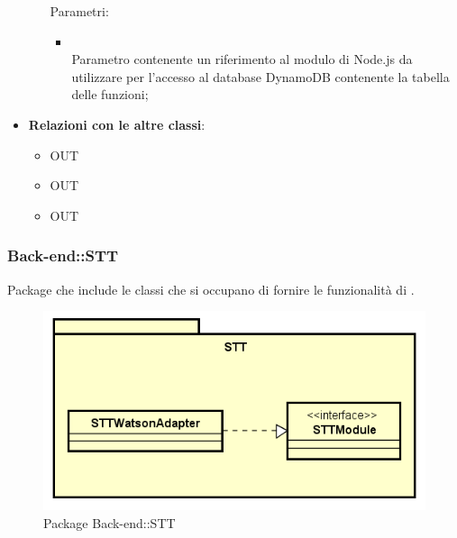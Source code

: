 \begin{itemize}
\begin{itemize}
		Parametri:
		\begin{itemize}
			\item {} \\
			Parametro contenente un riferimento al modulo di Node.js da utilizzare per l'accesso al database DynamoDB contenente la tabella delle funzioni;
		\end{itemize}
	\end{itemize}
	\item \textbf{Relazioni con le altre classi}:
	\begin{itemize}
		\item OUT \hyperlink{Task_label}{}
		\item OUT \hyperlink{TaskObservable_label}{}
		\item OUT \hyperlink{ErrorObservable_label}{}
	\end{itemize}
\end{itemize}
\FloatBarrier

\subsubsection{Back-end::STT}
Package che include le classi che si occupano di fornire le funzionalità di .
\begin{figure}[h] \centering \includegraphics[width=\textwidth,height=\textheight,keepaspectratio]{images/diagrams/back-end/Official_Backend_0304/STT.png}
	\caption{Package Back-end::STT}
\end{figure}
\newpage

